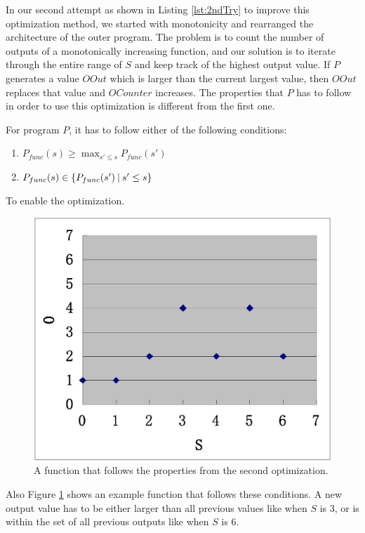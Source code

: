 In our second attempt as shown in Listing \ref{lst:2ndTry} to improve this optimization method, we started with monotonicity and rearranged the architecture of the outer program. The problem is to count the number of outputs of a monotonically increasing function, and our solution is to iterate through the entire range of $S$ and keep track of the highest output value. If $P$ generates a value $OOut$ which is larger than the current largest value, then $OOut$ replaces that value and $OCounter$ increases. The properties that $P$ has to follow in order to use this optimization is different from the first one.

For program $P$, it has to follow either of the following conditions:
\begin{enumerate}
\item $P_{func}(s) \geq \max_{ s'\leq s}{P_{func}(s')}$
\item $P_{func}(s) \in \{ P_{func}(s') \mathbin{|} s'\leq s \}$
\end{enumerate}
To enable the optimization.

\begin{figure}
\centering
\includegraphics[scale=0.8]{Figures/2ndTry}
\caption{A function that follows the properties from the second optimization.}
\label{fig:2ndTry}
\end{figure}

Also Figure \ref{fig:2ndTry} shows an example function that follows these conditions. A new output value has to be either larger than all previous values like when $S$ is $3$, or is within the set of all previous outputs like when $S$ is $6$.




